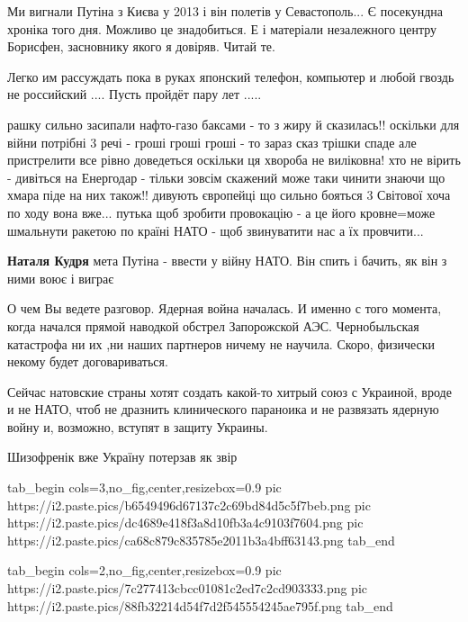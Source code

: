 \begin{itemize}

Ми вигнали Путіна з Києва у 2013 і він полетів у Севастополь... Є посекундна
хроніка того дня. Можливо це знадобиться. Е і матеріали незалежного центру
Борисфен, засновнику якого я довіряв. Читай те.


Легко им рассуждать пока в руках японский телефон, компьютер и любой гвоздь не
российский .... Пусть пройдёт пару лет .....


рашку сильно засипали нафто-газо баксами - то з жиру й сказилась!! оскільки для
війни потрібні 3 речі - гроші гроші гроші - то зараз сказ трішки спаде але
пристрелити все рівно доведеться оскільки ця хвороба не виліковна! хто не
вірить - дивіться на Енергодар - тільки зовсім скажений може таки чинити знаючи
що хмара піде на них також!! дивують європейці що сильно бояться 3 Світової
хоча по ходу вона вже... путька щоб зробити провокацію - а це його кровне=може
шмальнути ракетою по країні НАТО - щоб звинуватити нас а їх провчити...

\textbf{Наталя Кудря} мета Путіна - ввести у війну НАТО. Він спить і бачить, як він з ними воює і виграє


О чем Вы ведете разговор. Ядерная война началась. И именно с того момента,
когда начался прямой наводкой обстрел Запорожской АЭС. Чернобыльская катастрофа
ни их ,ни наших партнеров ничему не научила. Скоро, физически некому будет
договариваться.


Сейчас натовские страны хотят создать какой-то хитрый союз с Украиной, вроде и
не НАТО, чтоб не дразнить клинического параноика и не развязать ядерную войну
и, возможно, вступят в защиту Украины.

Шизофренік вже Україну потерзав як звір

\ifcmt
  tab_begin cols=3,no_fig,center,resizebox=0.9
     pic https://i2.paste.pics/b6549496d67137c2c69bd84d5c5f7beb.png
		 pic https://i2.paste.pics/dc4689e418f3a8d10fb3a4c9103f7604.png
		 pic https://i2.paste.pics/ca68c879c835785e2011b3a4bff63143.png
  tab_end
\fi

\ifcmt
  tab_begin cols=2,no_fig,center,resizebox=0.9
     pic https://i2.paste.pics/7c277413cbcc01081c2ed7c2cd903333.png
		 pic https://i2.paste.pics/88fb32214d54f7d2f545554245ae795f.png
  tab_end
\fi


\end{itemize}
